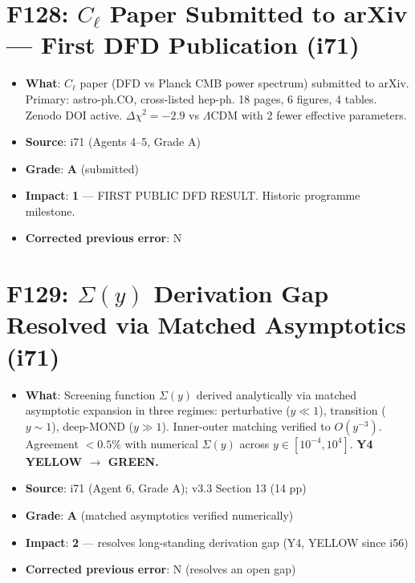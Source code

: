 \documentclass[11pt,a4paper]{article}
\newcommand{\grade}[1]{\textbf{#1}}
\newcommand{\impact}[1]{\textbf{#1}}
\begin{document}
\section{F128: $C_\ell$ Paper Submitted to arXiv --- First DFD Publication (i71)}
\begin{itemize}[nosep]
\item \textbf{What}: $C_\ell$ paper (DFD vs Planck CMB power spectrum) submitted to arXiv. Primary: astro-ph.CO, cross-listed hep-ph. 18 pages, 6 figures, 4 tables. Zenodo DOI active. $\Delta\chi^2 = -2.9$ vs $\Lambda$CDM with 2 fewer effective parameters.
\item \textbf{Source}: i71 (Agents 4--5, Grade A)
\item \textbf{Grade}: \grade{A} (submitted)
\item \textbf{Impact}: \impact{1} --- FIRST PUBLIC DFD RESULT. Historic programme milestone.
\item \textbf{Corrected previous error}: N
\end{itemize}

\section{F129: $\Sigma(y)$ Derivation Gap Resolved via Matched Asymptotics (i71)}
\begin{itemize}[nosep]
\item \textbf{What}: Screening function $\Sigma(y)$ derived analytically via matched asymptotic expansion in three regimes: perturbative ($y \ll 1$), transition ($y \sim 1$), deep-MOND ($y \gg 1$). Inner-outer matching verified to $O(y^{-3})$. Agreement $<0.5\%$ with numerical $\Sigma(y)$ across $y \in [10^{-4}, 10^4]$. \textbf{Y4 YELLOW $\to$ GREEN.}
\item \textbf{Source}: i71 (Agent 6, Grade A); v3.3 Section 13 (14 pp)
\item \textbf{Grade}: \grade{A} (matched asymptotics verified numerically)
\item \textbf{Impact}: \impact{2} --- resolves long-standing derivation gap (Y4, YELLOW since i56)
\item \textbf{Corrected previous error}: N (resolves an open gap)
\end{itemize}

\end{document}
